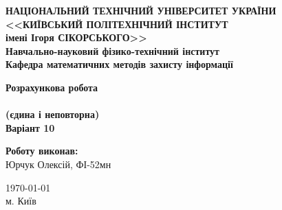 \thispagestyle{empty}
\linespread{1.1}

\begin{center}
    {\bfseries\large
        НАЦІОНАЛЬНИЙ ТЕХНІЧНИЙ УНІВЕРСИТЕТ УКРАЇНИ \\
        <<КИЇВСЬКИЙ ПОЛІТЕХНІЧНИЙ ІНСТИТУТ \\
        імені Ігоря СІКОРСЬКОГО>> \\
        Навчально-науковий фізико-технічний інститут \\
        \medskip
        Кафедра математичних методів захисту інформації}
\end{center}

\begin{center}
\vspace{40mm}
{\bfseries\huge Розрахункова робота} \\
{\bfseries\huge {}} \\
{\bfseries\huge (єдина і неповторна)} \\
{\bfseries\huge Варіант 10} \\
\end{center}

\vspace{55mm}
\begin{center}
    \hfill
    \begin{minipage}[t]{0.4\textwidth}
        \begin{flushright}
            \textbf{Роботу виконав:} \\
            Юрчук Олексій, ФІ-52мн
        \end{flushright}
    \end{minipage}
\end{center}

\vfill
\begin{center}
    \today \\
    {м. Київ}
\end{center}

\newpage
{}
